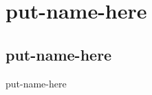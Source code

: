 \section{put-name-here}

\subsection{put-name-here}

\begin{frame}{put-name-here}

\begin{columns}
    

    
\end{columns}  
    
\end{frame}

